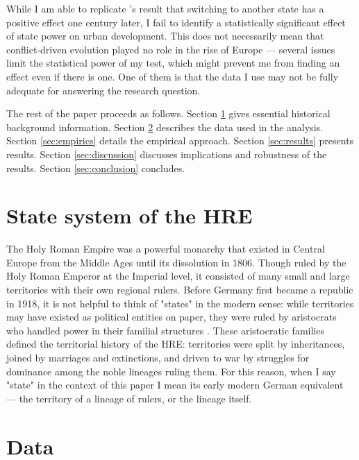 \documentclass[11pt, a4paper]{article}
\begin{document}
While I am able to replicate \cite{schoenholzer2022}'s result that switching to another state has a positive effect one century later, I fail to identify a statistically significant effect of state power on urban development. This does not necessarily mean that conflict-driven evolution played no role in the rise of Europe --- several issues limit the statistical power of my test, which might prevent me from finding an effect even if there is one. One of them is that the data I use may not be fully adequate for answering the research question.

The rest of the paper proceeds as follows. Section \ref{sec:background} gives essential historical background information. Section \ref{sec:data} describes the data used in the analysis. Section \ref{sec:empirics} details the empirical approach. Section \ref{sec:results} presents results. Section \ref{sec:discussion} discusses implications and robustness of the results. Section \ref{sec:conclusion} concludes.



\section{State system of the HRE} \label{sec:background}

The Holy Roman Empire was a powerful monarchy that existed in Central Europe from the Middle Ages until its dissolution in 1806. Though ruled by the Holy Roman Emperor at the Imperial level, it consisted of many small and large territories with their own regional rulers. Before Germany first became a republic in 1918, it is not helpful to think of "states" in the modern sense: while territories may have existed as political entities on paper, they were ruled by aristocrats who handled power in their familial structures \citep[pp. 2-3]{pt2}. These aristocratic families defined the territorial history of the HRE: territories were split by inheritances, joined by marriages and extinctions, and driven to war by struggles for dominance among the noble lineages ruling them. For this reason, when I say "state" in the context of this paper I mean its early modern German equivalent --- the territory of a lineage of rulers, or the lineage itself.


\section{Data} \label{sec:data}
\end{document}
